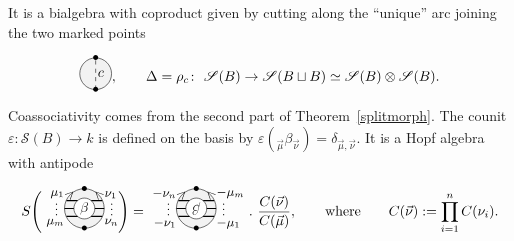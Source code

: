 \documentclass[pdftex]{sigma}%
\numberwithin{equation}{section}
\begin{document}
\begin{Example}
It is a bialgebra with coproduct given by cutting along the ``unique'' arc joining the two marked points \[
\begin{tikzpicture}[scale = 0.8, baseline = -5pt]
\fill [gray!10] (0,0) circle (0.5);
\draw (0,0) circle (0.5);
\node at (0,-0.5){\small $\bullet$};
\node at (0,0.5){\small $\bullet$};
\draw [dashed] (0,-0.5) -- (0,0.5) node[midway, right = -2pt]{$c$};
\end{tikzpicture}, \qquad
\Delta=\rho_c\colon\ \mathscr{S}(B) \to \mathscr{S}(B \sqcup B) \simeq \mathscr{S}(B) \otimes \mathscr{S}(B).
\]
Coassociativity comes from the second part of Theorem~\ref{splitmorph}. The counit $\varepsilon\colon \mathscr{S}(B) \to k$ is defined on the basis by $\varepsilon(_{\vec{\mu}}\beta_{\vec{\nu}}) = \delta_{\vec{\mu},\vec{\nu}}$.
It is a Hopf algebra with antipode
\[
S\Bigg(\begin{tikzpicture}[scale = 1, baseline = -5pt]
\fill [gray!10] (0,0) circle (0.5);
\draw (0,0) circle (0.5);
\node[rotate = 45] at (135:0.5) {\small $>$};
\node[rotate = -45] at (45:0.5) {\small $<$};
\node at (0,-0.5){\small $\bullet$};
\node at (0,0.5){\small $\bullet$};
\draw [thick] (-0.5,0) node[rotate = 90, above]{\footnotesize $\cdots$} -- (0.5,0) node[rotate = 90, below]{\footnotesize $\cdots$};
\draw [thick] (-0.45,-0.2) node[below left = -2pt]{\small $\mu_m$} -- (0.45,-0.2) node[below right = -2pt]{\small $\nu_n$};
\draw [thick] (-0.45,0.2) node[above left = -2pt]{\small $\mu_1$} -- (0.45,0.2) node[above right = -2pt]{\small $\nu_1$};
\node[circle, fill = white, draw = black, inner sep = 1.5pt] at (0,0) {$\beta$};
\end{tikzpicture}\!\!\Bigg)=
\begin{tikzpicture}[scale = 1, baseline = -5pt]
\fill [gray!10] (0,0) circle (0.5);
\draw (0,0) circle (0.5);
\node[rotate = 45] at (135:0.5) {\small $>$};
\node[rotate = -45] at (45:0.5) {\small $<$};
\node at (0,-0.5){\small $\bullet$};
\node at (0,0.5){\small $\bullet$};
\draw [thick] (-0.5,0) node[rotate = 90, above]{\footnotesize $\cdots$} -- (0.5,0) node[rotate = 90, below]{\footnotesize $\cdots$};
\draw [thick] (-0.45,-0.2) node[below left = -2pt]{\small $-\nu_1$} -- (0.45,-0.2) node[below right = -2pt]{\small $-\mu_1$};
\draw [thick] (-0.45,0.2) node[above left = -2pt]{\small $-\nu_n$} -- (0.45,0.2) node[above right = -2pt]{\small $-\mu_m$};
\node[circle, rotate = 180, fill = white, draw = black, inner sep = 1.5pt] at (0,0) {$\beta$};
\end{tikzpicture}
 .\ \frac{C(\vec{\nu})}{C(\vec{\mu})},\qquad
\text{where}\qquad C(\vec{\nu}):= \prod_{i=1}^n C(\nu_i).
\]
\end{Example}
\end{document}

